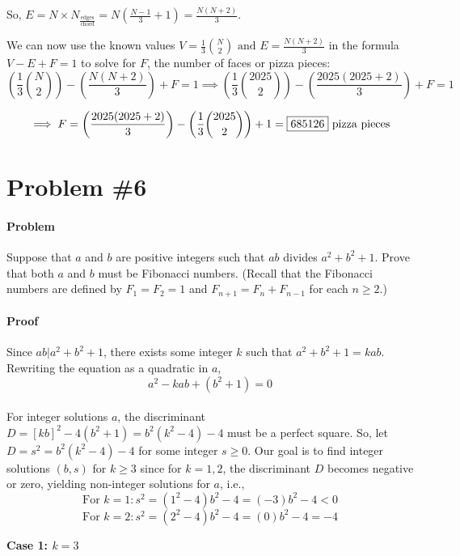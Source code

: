 \documentclass[10pt]{article}
\theoremstyle{plain}
\theoremstyle{definition}
\theoremstyle{remark}
\begin{document}
So, \(E=N\times N_{\frac{\text{edges}}{\text{chord}}}=N(\frac{N-1}{3}+1)=\frac{N(N+2)}{3}.\)

We can now use the known values \(V=\frac{1}{3}\binom{N}{2}\text{ and }E=\frac{N(N+2)}{3}\) in the formula \(V-E+F=1\) to solve for \(F\), the number of faces or pizza pieces: \[\left(\frac{1}{3}\binom{N}{2}\right)-\left(\frac{N(N+2)}{3}\right)+F=1\implies \left(\frac{1}{3}\binom{2025}{2}\right)-\left(\frac{2025(2025+2)}{3}\right)+F=1\]

\[\implies F = \left(\frac{2025(2025+2)}{3}\right) - \left(\frac{1}{3}\binom{2025}{2}\right) + 1 = \fbox{685126} \text{ pizza pieces}\]

\section{Problem \#6}

\paragraph{Problem} Suppose that \(a\) and \(b\) are positive integers such that \(ab\) divides \(a^2+b^2+1\). Prove that both \(a\) and \(b\) must be Fibonacci numbers. (Recall that the Fibonacci numbers are defined by \(F_1=F_2=1\) and \(F_{n+1}=F_n+F_{n-1}\) for each \(n\geq2\).)

\paragraph{Proof} Since \(ab|a^2+b^2+1\), there exists some integer \(k\) such that \(a^2+b^2+1=kab\). Rewriting the equation as a quadratic in \(a\),\\ \begin{equation} \label{eq:1}a^2-kab+(b^2+1)=0\end{equation}\\ For integer solutions \(a\), the discriminant \(D=[kb]^2-4(b^2+1)=b^2(k^2-4)-4\) must be a perfect square. So, let \(D=s^2=b^2(k^2-4)-4\) for some integer \(s\geq0\). Our goal is to find integer solutions \((b,s)\) for \(k\geq3\) since for \(k=1,2\), the discriminant \(D\) becomes negative or zero, yielding non-integer solutions for \(a\), i.e., 
\[\text{For \(k=1\)}: s^2=(1^2-4)b^2-4=(-3)b^2-4<0\]
\[\text{For \(k=2\)}: s^2=(2^2-4)b^2-4=(0)b^2-4=-4\]

\textbf{Case 1: \(k=3\)}\
\end{document}
